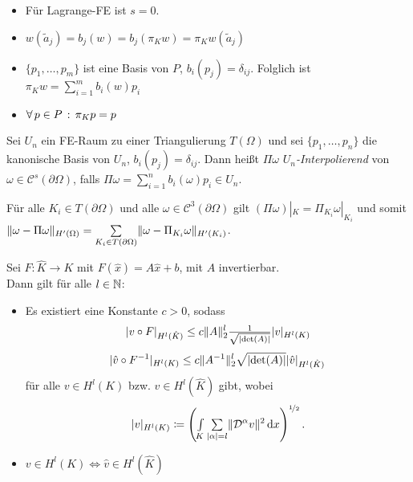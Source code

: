 \documentclass{cheat-sheet}
\newcommand{\Cont}{\mathcal{C}} %
\newcommand{\bOmega}{\partial \Omega} %
\newcommand{\DO}{\mathcal{D}} %
\begin{document}
\begin{bem}
  \begin{itemize}
    \item Für Lagrange-FE ist $s = 0$.
    \item $w(\tilde{a}_j) = b_j(w) = b_j(\pi_K w) = \pi_K w(\tilde{a}_j)$
    \item $\{ p_1, \ldots, p_m \}$ ist eine Basis von $P$, \dh{} $b_i(p_j) = \delta_{ij}$. Folglich ist $\pi_K w = \sum_{i=1}^m b_i(w) p_i$
    \item $\forall \, {p \in P} \,:\, \pi_K p = p$
  \end{itemize}
\end{bem}


\begin{defn}
  Sei $U_n$ ein FE-Raum zu einer Triangulierung $T(\Omega)$ und sei $\{ p_1, \ldots, p_n \}$ die kanonische Basis von $U_n$, \dh{} $b_i(p_j) = \delta_{ij}$.
  Dann heißt $\Pi \omega$ \emph{$U_n$-Interpolierend} von $\omega \in \Cont^s(\bOmega)$, falls $\Pi \omega = \sum_{i=1}^n b_i(\omega) p_i \in U_n$.
\end{defn}

\begin{lem}
  Für alle $K_i \in T(\bOmega)$ und alle $\omega \in \Cont^3(\bOmega)$ gilt $(\Pi \omega) |_K = \Pi_{K_i} \omega|_{K_i}$ und somit $\norm{\omega - \Pi \omega}_{H'(\Omega)} = \sum_{K_i \in T(\bOmega)} \norm{\omega - \Pi_{K_i} \omega}_{H'(K_i)}$.
\end{lem}

\begin{lem}
  Sei $F : \hat{K} \to K$ mit $F(\hat{x}) = A \hat{x} + b$, mit $A$ invertierbar. \\
  Dann gilt für alle $l \in \mathbb{N}$:
  \begin{itemize}
    \item Es existiert eine Konstante $c > 0$, sodass
    \[
      \lvert v \circ F\rvert_{H^l(\hat{K})} \leq c \lVert A\rVert_2^l \tfrac{1}{\sqrt{\lvert\det(A)\rvert}} \lvert v\rvert_{H^l(K)}
    \]
    \[
      \lvert\hat{v} \circ F^{-1}\rvert_{H^l(K)} \leq c \lVert A^{-1}\rVert_2^l \sqrt{\lvert\det(A)\rvert} \lvert\hat{v}\rvert_{H^l(\hat{K})}
    \]
    für alle $v \in H^l(K)$ bzw. $\hat{v} \in H^l(\hat{K})$ gibt, wobei
    \[
      \abs{v}_{H^l(K)} \coloneqq \left( \Int{K}{}{\sum_{\abs{\alpha} = l} \norm{\DO^\alpha v}^2} {x}\right)^{\nicefrac{1}{2}}.
    \]
    \item $v \in H^l(K) \iff \hat{v} \in H^l(\hat{K})$
  \end{itemize}
\end{lem}
\end{document}
